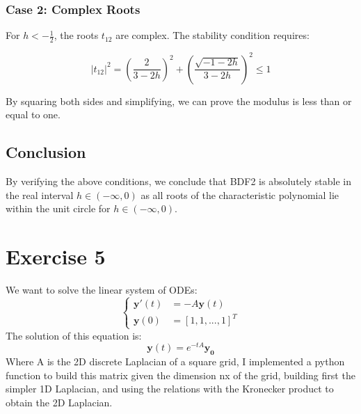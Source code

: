 \documentclass[a4paper,12pt]{article}
\begin{document}
\subsubsection*{Case 2: Complex Roots}

For \( h < -\frac{1}{2} \), the roots \( t_{12} \) are complex. The stability condition requires:

\[
|t_{12}|^2 = \left( \frac{2}{3 - 2h} \right)^2 + \left( \frac{\sqrt{-1 - 2h}}{3 - 2h} \right)^2 \leq 1
\]

By squaring both sides and simplifying, we can prove the modulus is less than or equal to one.

\subsection*{Conclusion}

By verifying the above conditions, we conclude that BDF2 is absolutely stable in the real interval \( h \in (-\infty, 0) \) as all roots of the characteristic polynomial lie within the unit circle for \( h \in (-\infty, 0) \).


\section{Exercise 5}
 We want to solve the linear system of ODEs:
 \begin{equation}
\begin{cases}
\mathbf{y}'(t) &= -A\mathbf{y}(t) \\
\mathbf{y}(0) &= [1,1,...,1]^T
\end{cases}
\end{equation}
The solution of this equation is:
 \begin{equation}
\mathbf{y}(t) = e^{-tA}\mathbf{y_0}
\end{equation}
Where A is the 2D discrete Laplacian of a square grid, I implemented a python function to build this matrix given the dimension nx of the grid, building first the simpler 1D Laplacian, and using the relations with the Kronecker product to obtain the 2D Laplacian.
\end{document}
